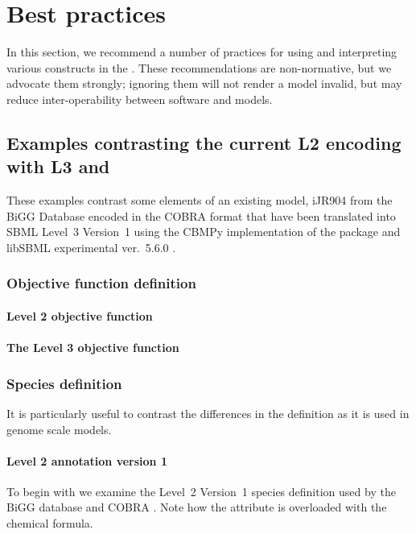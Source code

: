
\section{Best practices}
\label{best-practices}

In this section, we recommend a number of practices for using and
interpreting various constructs in the \FBCPackage.
These recommendations are non-normative, but we advocate them strongly;
ignoring them will not render a model invalid, but may reduce
inter-operability between software and models.

\subsection{Examples contrasting the current \SBML L2 encoding with L3 and \FBC}
These examples contrast some elements of an existing model, iJR904 from the \textsf{BiGG} Database encoded in the \textsf{COBRA} format \citep{ijr904, bigg, cobra} that have been translated into SBML Level~3 Version~1 using the \textsf{CBMPy} implementation of the \FBC package \citep{pysces, cbmpy} and \textsf{libSBML} experimental ver.~5.6.0 \citep{libsbml}.

\subsubsection*{Objective function definition}
\paragraph{\SBML Level 2 objective function}

\paragraph{The \SBML Level 3 objective function}
\protect{}

\subsubsection*{Species definition}
It is particularly useful to contrast the differences in the \Species definition as it is used in genome scale models.

\paragraph{\SBML Level 2 \Species annotation version 1}
To begin with we examine the \SBML Level~2 Version~1 species definition used by the BiGG database and \textsf{COBRA} \citep{bigg, cobra}. Note how the  attribute is overloaded with the chemical formula.
%

